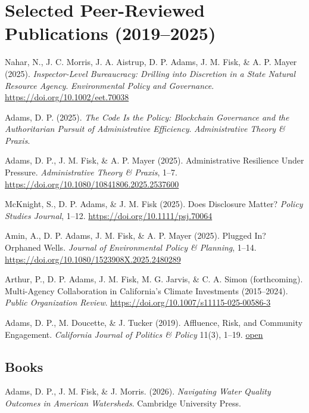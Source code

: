 \documentclass[12pt,letterpaper]{article}
\renewenvironment{itemize}{
  \begin{list}{}{
    \setlength{\leftmargin}{1.2em}
    \setlength{\itemsep}{0.15em}
    \setlength{\parskip}{0pt}
    \setlength{\parsep}{0.15em}
  }
}{
  \end{list}
}
\begin{document}
\section*{Selected Peer-Reviewed Publications (2019--2025)}
\begin{itemize}
  \item Nahar, N., J. C. Morris, J. A. Aistrup, D. P. Adams, J. M. Fisk, \& A. P. Mayer (2025). \emph{Inspector-Level Bureaucracy: Drilling into Discretion in a State Natural Resource Agency}. \emph{Environmental Policy and Governance}. \href{https://doi.org/10.1002/eet.70038}{https://doi.org/10.1002/eet.70038}
  \item Adams, D. P. (2025). \emph{The Code Is the Policy: Blockchain Governance and the Authoritarian Pursuit of Administrative Efficiency}. \emph{Administrative Theory \& Praxis}.
  \item Adams, D. P., J. M. Fisk, \& A. P. Mayer (2025). Administrative Resilience Under Pressure. \emph{Administrative Theory \& Praxis}, 1--7. \href{https://doi.org/10.1080/10841806.2025.2537600}{https://doi.org/10.1080/10841806.2025.2537600}
  \item McKnight, S., D. P. Adams, \& J. M. Fisk (2025). Does Disclosure Matter? \emph{Policy Studies Journal}, 1--12. \href{https://doi.org/10.1111/psj.70064}{https://doi.org/10.1111/psj.70064}
  \item Amin, A., D. P. Adams, J. M. Fisk, \& A. P. Mayer (2025). Plugged In? Orphaned Wells. \emph{Journal of Environmental Policy \& Planning}, 1--14. \href{https://doi.org/10.1080/1523908X.2025.2480289}{https://doi.org/10.1080/1523908X.2025.2480289}
  \item Arthur, P., D. P. Adams, J. M. Fisk, M. G. Jarvis, \& C. A. Simon (forthcoming). Multi-Agency Collaboration in California's Climate Investments (2015--2024). \emph{Public Organization Review}. \href{https://doi.org/10.1007/s11115-025-00586-3}{https://doi.org/10.1007/s11115-025-00586-3}
  \item Adams, D. P., M. Doucette, \& J. Tucker (2019). Affluence, Risk, and Community Engagement. \emph{California Journal of Politics \& Policy} 11(3), 1--19. \href{https://escholarship.org/uc/item/2mz2n6qk}{open}
\end{itemize}

\subsection*{Books}
\begin{itemize}
  \item Adams, D. P., J. M. Fisk, \& J. Morris. (2026). \emph{Navigating Water Quality Outcomes in American Watersheds}. Cambridge University Press.
\end{itemize}
\end{document}
